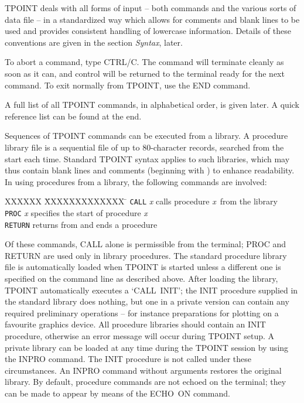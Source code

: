 TPOINT deals with all forms of input -- both commands and the
various sorts of data file -- in a standardized way which
allows for comments and blank lines to be used and provides
consistent handling of lowercase information.
Details of these conventions are given in the section
{\it Syntax}, later.

To abort a command, type CTRL/C.  The command will terminate
cleanly as soon as it can, and control will be returned to the
terminal ready for the next command.
To exit normally from TPOINT, use the END command.

A full list of all TPOINT commands, in alphabetical order,
is given later.  A quick reference list can be found at the
end.

Sequences of TPOINT commands can be executed from a library.  A
procedure library file is a sequential file of up to 80-character
records, searched from the start each time.  Standard TPOINT
syntax applies to such libraries, which may thus contain
blank lines and comments (beginning with \fstring{!}) to
enhance readability.  In using procedures
from a library, the following commands are involved:
\begin{tabs}
XXXXXX \= XXXXXXXXXXXXX \= \kill
\> {\tt CALL} {\it x} \> calls procedure {\it x}\, from the library \\
\> {\tt PROC} {\it x} \> specifies the start of procedure {\it x}\\
\> {\tt RETURN} \> returns from and ends a procedure
\end{tabs}
Of these commands,
CALL alone is permissible from the terminal; PROC and RETURN are
used only in library procedures.
The standard procedure library file is automatically loaded when
TPOINT is started unless a different one is specified on the
command line as described above.
After loading the library, TPOINT automatically executes a
\hbox{`CALL INIT'};
the INIT procedure supplied in the standard library
does nothing, but one in a private version can contain any required
preliminary operations -- for instance preparations for plotting on a
favourite graphics device.
All procedure libraries should contain an INIT procedure, otherwise an
error message will occur during TPOINT setup.
A private library can be loaded at any time during the TPOINT
session by using the INPRO command.
The INIT procedure is not called under these circumstances.
An INPRO command without arguments restores the original library.
By default, procedure commands are not echoed on the terminal;
they can be made to appear by means of the ECHO~ON command.


